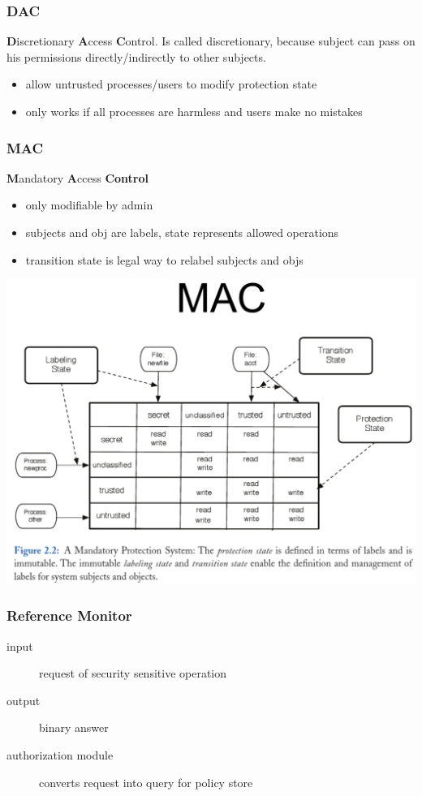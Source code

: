 \subsubsection{DAC}
\textbf{D}iscretionary \textbf{A}ccess \textbf{C}ontrol.
Is called discretionary, because subject can pass on his permissions directly/indirectly to other subjects.
\begin{itemize}
    \item allow untrusted processes/users to modify protection state
    \item only works if all processes are harmless and users make no mistakes
\end{itemize}
\subsubsection{MAC}
\textbf{M}andatory \textbf{A}ccess \textbf{Control}

\begin{itemize}
    \item only modifiable by admin
    \item subjects and obj are labels, state represents allowed operations
    \item transition state is legal way to relabel subjects and objs
\end{itemize}

\begin{center}
    \includegraphics[width=0.9\linewidth]{images/os_sec_MAC.png}
\end{center}

\subsubsection{Reference Monitor}
\begin{description}
    \item[input] request of security sensitive operation
    \item[output] binary answer
    \item[authorization module] converts request into query for policy store
\end{description}

